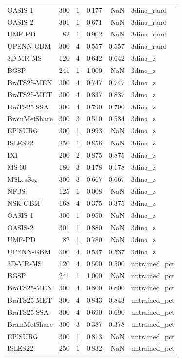 \begin{tabular}{lrrrrl}
OASIS-1 & 300 & 1 & 0.177 & NaN & 3dino\_rand \\
OASIS-2 & 301 & 1 & 0.671 & NaN & 3dino\_rand \\
UMF-PD & 82 & 1 & 0.902 & NaN & 3dino\_rand \\
UPENN-GBM & 300 & 4 & 0.557 & 0.557 & 3dino\_rand \\
3D-MR-MS & 120 & 4 & 0.642 & 0.642 & 3dino\_z \\
BGSP & 241 & 1 & 1.000 & NaN & 3dino\_z \\
BraTS25-MEN & 300 & 4 & 0.747 & 0.747 & 3dino\_z \\
BraTS25-MET & 300 & 4 & 0.837 & 0.837 & 3dino\_z \\
BraTS25-SSA & 300 & 4 & 0.790 & 0.790 & 3dino\_z \\
BrainMetShare & 300 & 3 & 0.510 & 0.584 & 3dino\_z \\
EPISURG & 300 & 1 & 0.993 & NaN & 3dino\_z \\
ISLES22 & 250 & 1 & 0.856 & NaN & 3dino\_z \\
IXI & 200 & 2 & 0.875 & 0.875 & 3dino\_z \\
MS-60 & 180 & 3 & 0.178 & 0.178 & 3dino\_z \\
MSLesSeg & 300 & 3 & 0.667 & 0.667 & 3dino\_z \\
NFBS & 125 & 1 & 0.008 & NaN & 3dino\_z \\
NSK-GBM & 168 & 4 & 0.375 & 0.375 & 3dino\_z \\
OASIS-1 & 300 & 1 & 0.950 & NaN & 3dino\_z \\
OASIS-2 & 301 & 1 & 0.880 & NaN & 3dino\_z \\
UMF-PD & 82 & 1 & 0.780 & NaN & 3dino\_z \\
UPENN-GBM & 300 & 4 & 0.537 & 0.537 & 3dino\_z \\
3D-MR-MS & 120 & 4 & 0.500 & 0.500 & untrained\_pct \\
BGSP & 241 & 1 & 1.000 & NaN & untrained\_pct \\
BraTS25-MEN & 300 & 4 & 0.800 & 0.800 & untrained\_pct \\
BraTS25-MET & 300 & 4 & 0.843 & 0.843 & untrained\_pct \\
BraTS25-SSA & 300 & 4 & 0.690 & 0.690 & untrained\_pct \\
BrainMetShare & 300 & 3 & 0.387 & 0.378 & untrained\_pct \\
EPISURG & 300 & 1 & 0.813 & NaN & untrained\_pct \\
ISLES22 & 250 & 1 & 0.832 & NaN & untrained\_pct \\

\end{tabular}
